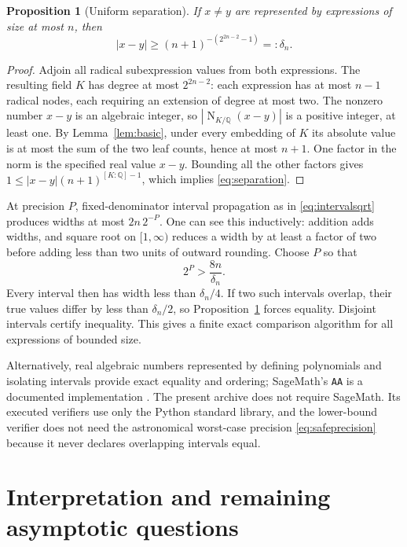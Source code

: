 \documentclass[11pt,letterpaper]{article}
\numberwithin{equation}{section}
\newtheorem{proposition}[theorem]{Proposition}
\theoremstyle{definition}
\newcommand{\Q}{\mathbb Q}
\DeclareMathOperator{\Norm}{N}
\begin{document}
\begin{proposition}[Uniform separation]\label{prop:separation}
If $x\ne y$ are represented by expressions of size at most $n$, then
\begin{equation}\label{eq:separation}
 |x-y|\ge
 (n+1)^{-(2^{2n-2}-1)}=:\delta_n.
\end{equation}
\end{proposition}
\begin{proof}
Adjoin all radical subexpression values from both expressions. The resulting
field $K$ has degree at most $2^{2n-2}$: each expression has at most $n-1$
radical nodes, each requiring an extension of degree at most two.
The nonzero number $x-y$ is an algebraic integer, so
$|\Norm_{K/\Q}(x-y)|$ is a positive integer, at least one.
By Lemma~\ref{lem:basic}, under every embedding of $K$ its absolute value is
at most the sum of the two leaf counts, hence at most $n+1$.
One factor in the norm is the specified real value $x-y$. Bounding all the
other factors gives
$1\le|x-y|(n+1)^{[K:\Q]-1}$, which implies \eqref{eq:separation}.
\end{proof}

At precision $P$, fixed-denominator interval propagation as in
\eqref{eq:intervalsqrt} produces widths at most $2n\,2^{-P}$.
One can see this inductively: addition adds widths, and square root on
$[1,\infty)$ reduces a width by at least a factor of two before adding
less than two units of outward rounding.
Choose $P$ so that
\begin{equation}\label{eq:safeprecision}
 2^P>\frac{8n}{\delta_n}.
\end{equation}
Every interval then has width less than $\delta_n/4$.
If two such intervals overlap, their true values differ by less than
$\delta_n/2$, so Proposition~\ref{prop:separation} forces equality.
Disjoint intervals certify inequality. This gives a finite exact comparison
algorithm for all expressions of bounded size.

Alternatively, real algebraic numbers represented by defining polynomials and
isolating intervals provide exact equality and ordering; SageMath's
\texttt{AA} is a documented implementation \cite{sage}.
The present archive does not require SageMath. Its executed verifiers use only
the Python standard library, and the lower-bound verifier does not need the
astronomical worst-case precision \eqref{eq:safeprecision} because it never
declares overlapping intervals equal.

\section{Interpretation and remaining asymptotic questions}
\end{document}
